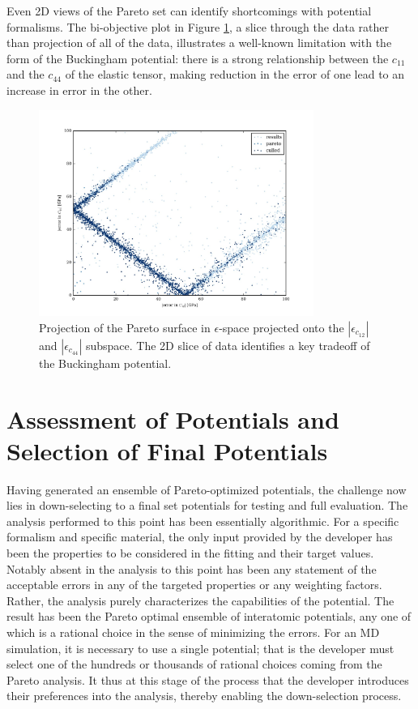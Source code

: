 Even 2D views of the Pareto set can identify shortcomings with potential formalisms.  The bi-objective plot in Figure \ref{fig:MgO_bivariate_c11_v_c44}, a slice through the data rather than projection of all of the data, illustrates a well-known limitation with the form of the Buckingham potential: there is a strong relationship between the $c_{11}$ and the $c_{44}$ of the elastic tensor, making reduction in the error of one lead to an increase in error in the other.

\begin{figure}[ht]
	\centering
  \includegraphics[width=0.8\textwidth]{chapter7/MgO_bivariate_c11_v_c44}
  \caption{Projection of the Pareto surface  in $\epsilon$-space projected onto the $|\epsilon_{c_{12}}|$ and $|\epsilon_{c_{44}}|$ subspace.  The 2D slice of data identifies a key tradeoff of the Buckingham potential.}
  \label{fig:MgO_bivariate_c11_v_c44}
\end{figure}


\section{Assessment of Potentials and Selection of Final Potentials}

Having generated an ensemble of Pareto-optimized potentials, the challenge now lies in down-selecting to a final set potentials for testing and full evaluation. The analysis performed to this point has been essentially algorithmic. For a specific formalism and specific material, the only input provided by the developer has been the properties to be considered in the fitting and their target values. Notably absent in the analysis to this point has been any statement of the acceptable errors in any of the targeted properties or any weighting factors. Rather, the analysis purely characterizes the capabilities of the potential. The result has been the Pareto optimal ensemble of interatomic potentials, any one of which is a rational choice in the sense of minimizing the errors. For an MD simulation, it is necessary to use a single potential; that is the developer must select one of the hundreds or thousands of rational choices coming from the Pareto analysis.  It thus at this stage of the process that the developer introduces their preferences into the analysis, thereby enabling the down-selection process.

